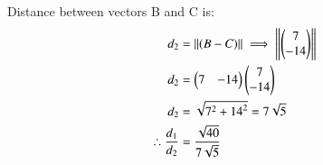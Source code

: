 \documentclass[journal]{IEEEtran}
\begin{document}
Distance between vectors B and C is:\\
\begin{align}
d_2&=\left\|{(B-C)}\right\|
 \implies \left\|\begin{pmatrix}7\\-14\end{pmatrix}\right\|\\
 d_2&=\begin{pmatrix}
7 & -14
\end{pmatrix}
\begin{pmatrix}
7\\
-14
\end{pmatrix}\\
d_2&= \sqrt{7^2 + {14}^2} =7\sqrt{5}\\
\therefore \frac{d_1}{d_2} &= \frac{\sqrt{40}}{7\sqrt{5}}
\end{align}
\begin{table}[h]
    \centering
    
    \caption{  }
    \label{tab.1}
\end{table}
\end{document}
